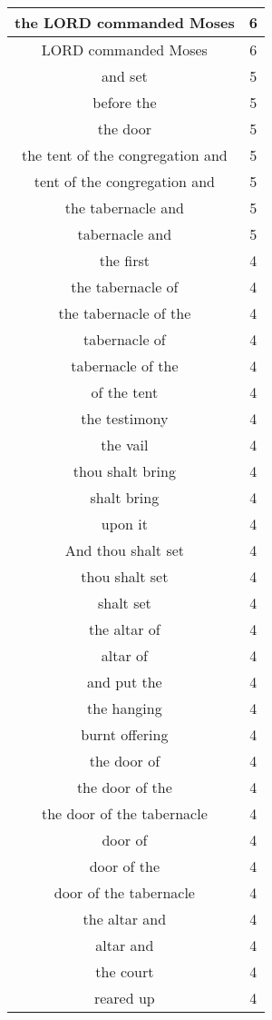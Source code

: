 \begin{center}
\begin{longtable}{|c|c|}
the LORD commanded Moses & 6\\ \hline 
LORD commanded Moses & 6\\ \hline 
and set & 5\\ \hline 
before the & 5\\ \hline 
the door & 5\\ \hline 
the tent of the congregation and & 5\\ \hline 
tent of the congregation and & 5\\ \hline 
the tabernacle and & 5\\ \hline 
tabernacle and & 5\\ \hline 
the first & 4\\ \hline 
the tabernacle of & 4\\ \hline 
the tabernacle of the & 4\\ \hline 
tabernacle of & 4\\ \hline 
tabernacle of the & 4\\ \hline 
of the tent & 4\\ \hline 
the testimony & 4\\ \hline 
the vail & 4\\ \hline 
thou shalt bring & 4\\ \hline 
shalt bring & 4\\ \hline 
upon it & 4\\ \hline 
And thou shalt set & 4\\ \hline 
thou shalt set & 4\\ \hline 
shalt set & 4\\ \hline 
the altar of & 4\\ \hline 
altar of & 4\\ \hline 
and put the & 4\\ \hline 
the hanging & 4\\ \hline 
burnt offering & 4\\ \hline 
the door of & 4\\ \hline 
the door of the & 4\\ \hline 
the door of the tabernacle & 4\\ \hline 
door of & 4\\ \hline 
door of the & 4\\ \hline 
door of the tabernacle & 4\\ \hline 
the altar and & 4\\ \hline 
altar and & 4\\ \hline 
the court & 4\\ \hline 
reared up & 4\\ \hline 

\end{longtable}
\end{center}
